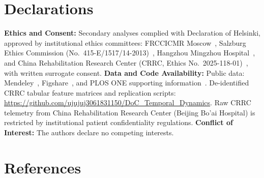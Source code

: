 \documentclass[journal,twoside,web]{ieeecolor}
\begin{document}
\section*{Declarations}
\vspace{-2pt}
{\fontsize{8.5pt}{10.0pt}\selectfont
\textbf{Ethics and Consent:} Secondary analyses complied with Declaration of Helsinki, approved by institutional ethics committees: FRCCICMR Moscow~\cite{nekrasova2020psg}, Salzburg Ethics Commission (No.~415-E/1517/14-2013)~\cite{wielek2018sleep}, Hangzhou Mingzhou Hospital~\cite{ling2024microstates}, and China Rehabilitation Research Center (CRRC, Ethics No.~2025-118-01)~\cite{duan2026auditory}, with written surrogate consent. \textbf{Data and Code Availability:} Public data: Mendeley~\cite{nekrasova2020psg}, Figshare~\cite{ling2024microstates,xu2021neural}, and PLOS ONE supporting information~\cite{wielek2018sleep}. De-identified CRRC tabular feature matrices and replication scripts: \url{https://github.com/ujujuj3061831150/DoC_Temporal_Dynamics}. Raw CRRC telemetry from China Rehabilitation Research Center (Beijing Bo'ai Hospital) is restricted by institutional patient confidentiality regulations. \textbf{Conflict of Interest:} The authors declare no competing interests.\par}

\def\IEEEbibitemsep{0.25pt}
\def\BIBdecl{\fontsize{8.5pt}{9.5pt}\selectfont\setlength{\itemsep}{0.35pt}}
\section*{References}


\end{document}
